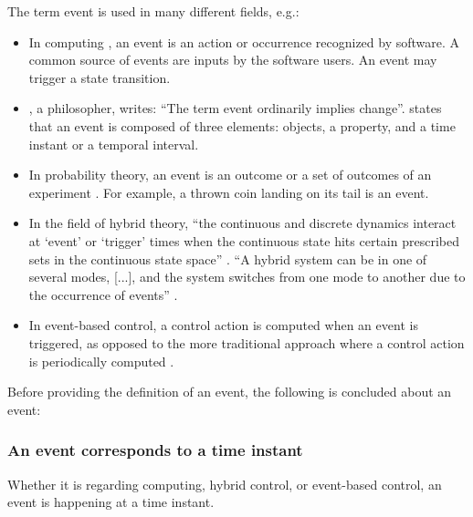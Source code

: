 The term event is used in many different fields, e.g.:
\begin{itemize}
	\item In computing \cite{breu1997towards}, an event is an action or occurrence recognized by software. A common source of events are inputs by the software users. An event may trigger a state transition.
	\item \textcite{kim1993supervenience}, a philosopher, writes: ``The term event ordinarily implies change''. \textcite{kim1993supervenience} states that an event is composed of three elements: objects, a property, and a time instant or a temporal interval. 
	\item In probability theory, an event is an outcome or a set of outcomes of an experiment \cite{pfeiffer2013concepts}. For example, a thrown coin landing on its tail is an event.
	\item In the field of hybrid theory, ``the continuous and discrete dynamics interact at `event' or `trigger' times when the continuous state hits certain prescribed sets in the continuous state space'' \cite{branicky1998hybridcontrol}. ``A hybrid system can be in one of several modes, [...], and the system switches from one mode to another due to the occurrence of events'' \cite{deschutter2000optimal}.
	\item In event-based control, a control action is computed when an event is triggered, as opposed to the more traditional approach where a control action is periodically computed \cite{heemels2012eventcontrol}. 
\end{itemize}

Before providing the definition of an event, the following is concluded about an event:

\subsubsection{An event corresponds to a time instant}
Whether it is regarding computing, hybrid control, or event-based control, an event is happening at a time instant.

